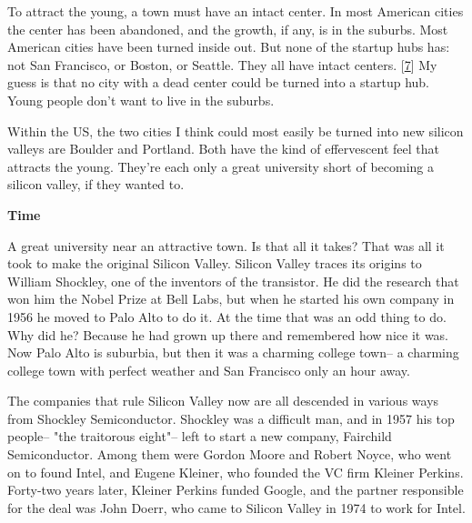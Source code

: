To attract the young, a town must have an intact
                  center. In most American cities the center has been abandoned,
                  and the growth, if any, is in the suburbs. Most American
                  cities have been turned inside out. But none of the startup
                  hubs has: not San Francisco, or Boston, or Seattle. They all
                  have intact centers.
                  [\href{\#f7n}{7}]
                  My guess is that no city with a dead center could be turned
                  into a startup hub. Young people don't want to live in the
                  suburbs.

Within the US, the two cities I think
                  could most easily be turned into new silicon valleys are
                  Boulder and Portland. Both have the kind of effervescent feel
                  that attracts the young. They're each only a great university
                  short of becoming a silicon valley, if they wanted to.

\textbf{Time}

A great university near an attractive town. Is
                  that all it takes? That was all it took to make the original
                  Silicon Valley. Silicon Valley traces its origins to William
                  Shockley, one of the inventors of the transistor. He did the
                  research that won him the Nobel Prize at Bell Labs, but when
                  he started his own company in 1956 he moved to Palo Alto to do
                  it. At the time that was an odd thing to do. Why did he?
                  Because he had grown up there and remembered how nice it was.
                  Now Palo Alto is suburbia, but then it was a charming college
                  town-- a charming college town with perfect weather and San
                  Francisco only an hour away.

The companies that
                  rule Silicon Valley now are all descended in various ways from
                  Shockley Semiconductor. Shockley was a difficult man, and in
                  1957 his top people-- "the traitorous eight"-- left to start a
                  new company, Fairchild Semiconductor. Among them were Gordon
                  Moore and Robert Noyce, who went on to found Intel, and Eugene
                  Kleiner, who founded the VC firm Kleiner Perkins. Forty-two
                  years later, Kleiner Perkins funded Google, and the partner
                  responsible for the deal was John Doerr, who came to Silicon
                  Valley in 1974 to work for Intel.

